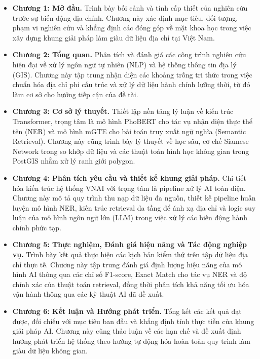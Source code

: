 \begin{itemize}
\item \textbf{Chương 1: Mở đầu.} Trình bày bối cảnh và tính cấp thiết của nghiên cứu trước sự biến động địa chính. Chương này xác định mục tiêu, đối tượng, phạm vi nghiên cứu và khẳng định các đóng góp về mặt khoa học trong việc xây dựng khung giải pháp làm giàu dữ liệu địa chỉ tại Việt Nam.

\item \textbf{Chương 2: Tổng quan.} Phân tích và đánh giá các công trình nghiên cứu hiện đại về xử lý ngôn ngữ tự nhiên (NLP) và hệ thống thông tin địa lý (GIS). Chương này tập trung nhận diện các khoảng trống tri thức trong việc chuẩn hóa địa chỉ phi cấu trúc và xử lý dữ liệu hành chính lưỡng thời, từ đó làm cơ sở cho hướng tiếp cận của đề tài.

\item \textbf{Chương 3: Cơ sở lý thuyết.} Thiết lập nền tảng lý luận về kiến trúc Transformer, trọng tâm là mô hình PhoBERT cho tác vụ nhận diện thực thể tên (NER) và mô hình mGTE cho bài toán truy xuất ngữ nghĩa (Semantic Retrieval). Chương này cũng trình bày lý thuyết về học sâu, cơ chế Siamese Network trong so khớp dữ liệu và các thuật toán hình học không gian trong PostGIS nhằm xử lý ranh giới polygon.

\item \textbf{Chương 4: Phân tích yêu cầu và thiết kế khung giải pháp.} Chi tiết hóa kiến trúc hệ thống VNAI với trọng tâm là pipeline xử lý AI toàn diện. Chương này mô tả quy trình thu nạp dữ liệu đa nguồn, thiết kế pipeline huấn luyện mô hình NER, kiến trúc retrieval đa tầng để ánh xạ địa chỉ và logic suy luận của mô hình ngôn ngữ lớn (LLM) trong việc xử lý các biến động hành chính phức tạp.

\item \textbf{Chương 5: Thực nghiệm, Đánh giá hiệu năng và Tác động nghiệp vụ.} Trình bày kết quả thực hiện các kịch bản kiểm thử trên tập dữ liệu địa chỉ thực tế. Chương này tập trung đánh giá định lượng hiệu năng của mô hình AI thông qua các chỉ số F1-score, Exact Match cho tác vụ NER và độ chính xác của thuật toán retrieval, đồng thời phân tích khả năng tối ưu hóa vận hành thông qua các kỹ thuật AI đã đề xuất.

\item \textbf{Chương 6: Kết luận và Hướng phát triển.} Tổng kết các kết quả đạt được, đối chiếu với mục tiêu ban đầu và khẳng định tính thực tiễn của khung giải pháp AI. Chương này cũng thảo luận về các hạn chế và đề xuất định hướng phát triển hệ thống theo hướng tự động hóa hoàn toàn quy trình làm giàu dữ liệu không gian.


\end{itemize}